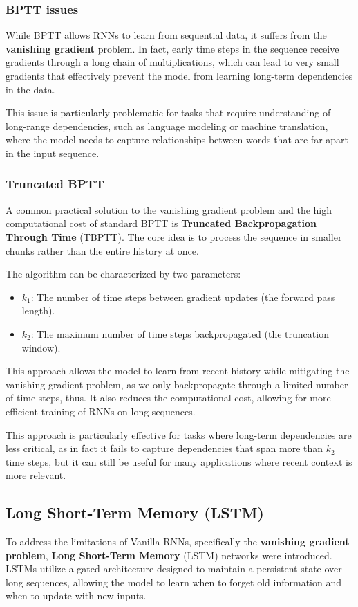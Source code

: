 \subsubsection{BPTT issues}
While BPTT allows RNNs to learn from sequential data, it suffers from the \textbf{vanishing gradient} problem.
In fact, early time steps in the sequence receive gradients through a long chain of multiplications, 
which can lead to very small gradients that effectively prevent the model from learning long-term dependencies in the data.

This issue is particularly problematic for tasks that require understanding of long-range dependencies, such as language modeling or machine translation, 
where the model needs to capture relationships between words that are far apart in the input sequence.

\subsubsection{Truncated BPTT}
A common practical solution to the vanishing gradient problem and the high 
computational cost of standard BPTT is \textbf{Truncated Backpropagation Through Time} (TBPTT). 
The core idea is to process the sequence in smaller chunks rather than the entire history at once.

The algorithm can be characterized by two parameters:
\begin{itemize}
    \item $k_1$: The number of time steps between gradient updates (the forward pass length).
    \item $k_2$: The maximum number of time steps backpropagated (the truncation window).
\end{itemize}
This approach allows the model to learn from recent history while mitigating the vanishing gradient problem, as we only backpropagate through a limited number of time steps, 
thus. It also reduces the computational cost, allowing for more efficient training of RNNs on long sequences.

This approach is particularly effective for tasks where long-term dependencies are less critical, as in fact
it fails to capture dependencies that span more than $k_2$ time steps, but it can still be useful for many applications where recent context is more relevant.

\subsection{Long Short-Term Memory (LSTM)}
To address the limitations of Vanilla RNNs, specifically the \textbf{vanishing gradient problem}, \textbf{Long Short-Term Memory} (LSTM) 
networks were introduced. LSTMs utilize a gated architecture designed to maintain a persistent state over long sequences, 
allowing the model to learn when to forget old information and when to update with new inputs.

